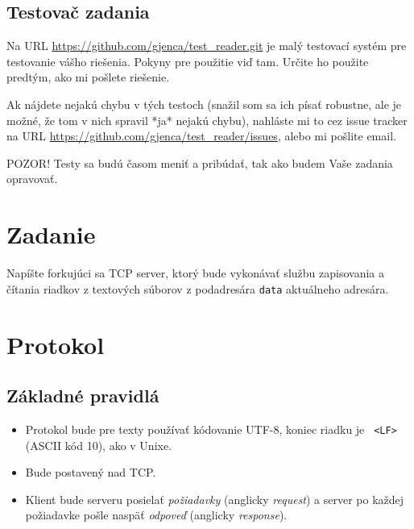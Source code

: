 \documentclass[11pt]{article}
\theoremstyle{definition}
\begin{document}
\subsection{Testovač zadania}

Na URL \url{https://github.com/gjenca/test_reader.git} je malý
testovací systém pre testovanie vášho riešenia. 
Pokyny pre použitie viď tam. Určite ho použite predtým, ako mi pošlete riešenie.

Ak nájdete nejakú chybu v tých testoch (snažil som sa ich písať robustne, ale je možné,
že tom v nich spravil *ja* nejakú chybu), nahláste mi to cez issue tracker na
URL \url{https://github.com/gjenca/test_reader/issues}, alebo mi pošlite email.

POZOR! Testy sa budú časom meniť
a pribúdať, tak ako budem Vaše zadania opravovať.

\section{Zadanie}

Napíšte forkujúci sa TCP server, ktorý bude vykonávať službu zapisovania a čítania
riadkov z textových súborov z podadresára \texttt{data} aktuálneho adresára.

\section{Protokol}

\subsection{Základné pravidlá}

\begin{itemize}
\item Protokol bude pre texty používať kódovanie UTF-8, koniec riadku je {\tt
<LF>} (ASCII kód 10), ako v Unixe.
\item Bude postavený nad TCP.
\item Klient bude serveru posielať \emph{požiadavky} (anglicky \emph{request}) a server po každej požiadavke pošle
naspäť \emph{odpoveď} (anglicky \emph{response}).
\end{itemize}
\end{document}

